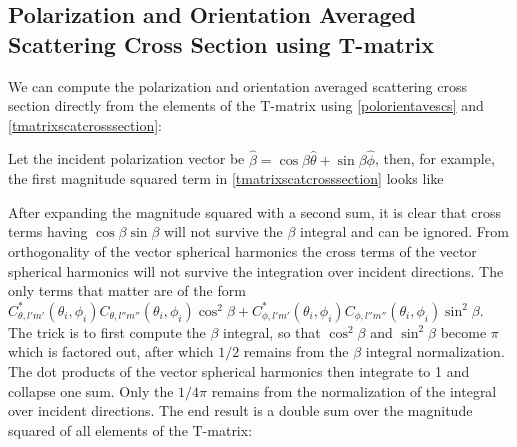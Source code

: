 \clearpage

\subsection{Polarization and Orientation Averaged Scattering Cross Section using T-matrix}

We can compute the polarization and orientation averaged scattering cross section directly from the elements of the T-matrix using \eqref{polorientavescs} and \eqref{tmatrixscatcrosssection}:

Let the incident polarization vector be $\hat{\beta} = \cos \beta \hat{\theta} + \sin\beta \hat{\phi}$, then, for example, the first magnitude squared term in \eqref{tmatrixscatcrosssection} looks like

After expanding the magnitude squared with a second sum, it is clear that cross terms having $\cos\beta\sin\beta$ will not survive the $\beta$ integral and can be ignored. From orthogonality of the vector spherical harmonics the cross terms of the vector spherical harmonics will not survive the integration over incident directions. The only terms that matter are of the form $C^*_{\theta,l'm'}(\theta_i,\phi_i)C_{\theta,l''m''}(\theta_i,\phi_i) \cos^2\beta + C^*_{\phi,l'm'}(\theta_i,\phi_i)C_{\phi,l''m''}(\theta_i,\phi_i) \sin^2\beta $. The trick is to first compute the $\beta$ integral, so that $\cos^2\beta$ and $\sin^2\beta$ become $\pi$ which is factored out, after which $1/2$ remains from the $\beta$ integral normalization. The dot products of the vector spherical harmonics then integrate to 1 and collapse one sum. Only the $1/4\pi$ remains from the normalization of the integral over incident directions. The end result is a double sum over the magnitude squared of all elements of the T-matrix:

